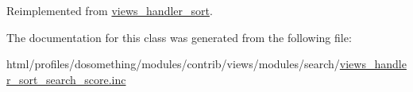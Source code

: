 Reimplemented from \hyperlink{classviews__handler__sort_a94fa33c5d037e41a927583fce2df3d18}{views\_\-handler\_\-sort}.

The documentation for this class was generated from the following file:\begin{DoxyCompactItemize}
\item 
html/profiles/dosomething/modules/contrib/views/modules/search/\hyperlink{views__handler__sort__search__score_8inc}{views\_\-handler\_\-sort\_\-search\_\-score.inc}\end{DoxyCompactItemize}
